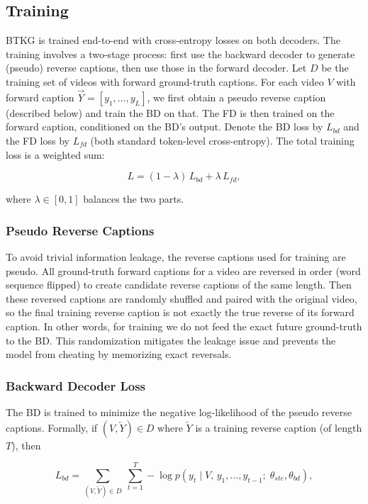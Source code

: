 \subsection{Training}

BTKG is trained end-to-end with cross-entropy losses on both decoders. The training involves a two-stage process: first use the backward decoder to generate (pseudo) reverse captions, then use those in the forward decoder. Let $D$ be the training set of videos with forward ground-truth captions. For each video $V$ with forward caption $\overrightarrow{Y}=[y_1,\dots,y_L]$, we first obtain a pseudo reverse caption (described below) and train the BD on that. The FD is then trained on the forward caption, conditioned on the BD's output. Denote the BD loss by $L_{bd}$ and the FD loss by $L_{fd}$ (both standard token-level cross-entropy). The total training loss is a weighted sum:

$$
L = (1-\lambda)\,L_{bd} + \lambda\,L_{fd},
$$

where $\lambda\in[0,1]$ balances the two parts.

\subsubsection{Pseudo Reverse Captions}

To avoid trivial information leakage, the reverse captions used for training are pseudo. All ground-truth forward captions for a video are reversed in order (word sequence flipped) to create candidate reverse captions of the same length. Then these reversed captions are randomly shuffled and paired with the original video, so the final training reverse caption is not exactly the true reverse of its forward caption. In other words, for training we do not feed the exact future ground-truth to the BD. This randomization mitigates the leakage issue and prevents the model from cheating by memorizing exact reversals.

\subsubsection{Backward Decoder Loss}

The BD is trained to minimize the negative log-likelihood of the pseudo reverse captions. Formally, if $(V,\overleftarrow{Y})\in D$ where $\overleftarrow{Y}$ is a training reverse caption (of length $T$), then

$$
L_{bd} = \sum_{(V,\overleftarrow{Y})\in D}\;\sum_{t=1}^T -\log p(y_t \mid V,\,y_1,\dots,y_{t-1};\;\theta_{ste},\theta_{bd}),
$$

